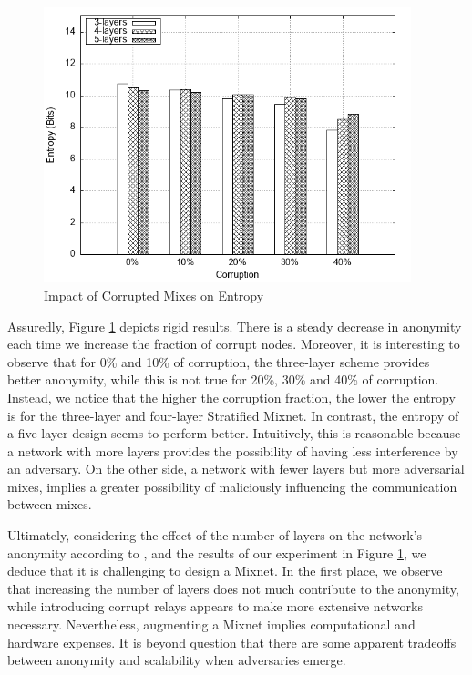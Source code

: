 \documentclass[logo,msc,cyber]{infthesis}   %
\begin{document}
\begin{figure}[h!]
    \centering
    \includegraphics[height=8cm]{figures/mixim/4.png}
    \caption{Impact of Corrupted Mixes on Entropy}
    \label{fig:corrupted-mixes}
 \end{figure}

Assuredly, Figure \ref{fig:corrupted-mixes} depicts rigid results. There is a
steady decrease in anonymity each time we increase the fraction of corrupt
nodes. Moreover, it is interesting to observe that for 0\% and 10\% of
corruption, the three-layer scheme provides better anonymity, while this is not
true for 20\%, 30\% and 40\% of corruption. Instead, we notice that the higher
the corruption fraction, the lower the entropy is for the three-layer and
four-layer Stratified Mixnet. In contrast, the entropy of a five-layer design
seems to perform better. Intuitively, this is reasonable because a network with
more layers provides the possibility of having less interference by an
adversary. On the other side, a network with fewer layers but more adversarial
mixes, implies a greater possibility of maliciously influencing the communication
between mixes.

Ultimately, considering the effect of the number of layers on the network's
anonymity according to \cite{ben2021mixim}, and the results of our experiment in
Figure \ref{fig:corrupted-mixes}, we deduce that it is challenging to design a
Mixnet. In the first place, we observe that increasing the number of layers does
not much contribute to the anonymity, while introducing corrupt relays appears to
make more extensive networks necessary. Nevertheless, augmenting a Mixnet
implies computational and hardware expenses. It is beyond question that there
are some apparent tradeoffs between anonymity and scalability when adversaries
emerge.
\end{document}
